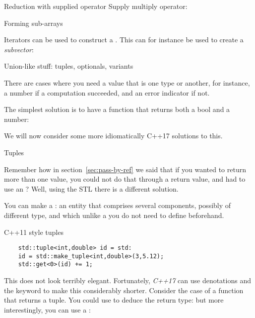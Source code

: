 \begin{block}{Reduction with supplied operator}
  \label{sl:vec-multiplies}
  Supply multiply operator:
\end{block}

 {Forming sub-arrays}

Iterators can be used to construct a . This can
for instance be used to create a
\emph{subvector}:
%

 {Union-like stuff: tuples, optionals, variants}

There are cases where you need a value that is one type or another,
for instance, a number if a computation succeeded, and an error
indicator if not.

The simplest solution is to have a function that returns both a bool
and a number:
%

We will now consider some more idiomatically C++17 solutions to this.

 {Tuples}
\label{sec:tuple}

Remember how in section~\ref{sec:pass-by-ref} we said that if you
wanted to return more than one value, you could not do that through a
return value, and had to use an ?
Well, using the \ac{STL} there is a different solution.

You can make a : an entity that comprises several
components, possibly of different type, and which unlike a
 you do not need to define beforehand.

\lstset{style=reviewcode,language=C++}
\begin{block}{C++11 style tuples}
  \label{sl:tuple11}
  \begin{lstlisting}
    std::tuple<int,double> id = std:
    id = std::make_tuple<int,double>(3,5.12);
    std::get<0>(id) += 1;
  \end{lstlisting}
\end{block}

This does not look terribly elegant. Fortunately,
\emph{C++17} can use denotations and the 
keyword to make this considerably shorter. Consider the case of a
function that returns a tuple. You could use  to deduce the
return type:
%
%
but more interestingly, you can use a
:
%

